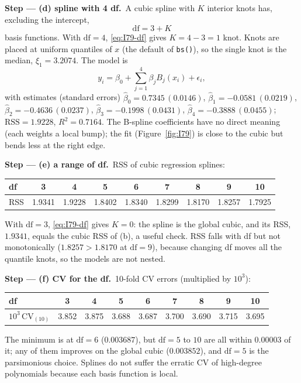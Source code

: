 \documentclass[11pt,a4paper]{article}
\numberwithin{equation}{questao}   %
\newcommand{\passo}[2]{\par\smallskip\noindent\textbf{Step --- #1.}~#2}
\begin{document}
\begin{sol}
\passo{(d) spline with 4 df}{A cubic spline with $K$ interior knots has, excluding the intercept,
\begin{equation}\label{eq:I79-df}
\mathrm{df}=3+K
\end{equation}
basis functions. With $\mathrm{df}=4$, \eqref{eq:I79-df} gives $K=4-3=1$ knot. Knots are placed
at uniform quantiles of $x$ (the default of \texttt{bs()}), so the single knot is the median,
$\xi_1=3.2074$. The model is
\begin{equation}\label{eq:I79-bs}
y_i=\beta_0+\sum_{j=1}^{4}\beta_jB_j(x_i)+\epsilon_i ,
\end{equation}
with estimates (standard errors) $\hat\beta_0=0.7345\,(0.0146)$, $\hat\beta_1=-0.0581\,(0.0219)$,
$\hat\beta_2=-0.4636\,(0.0237)$, $\hat\beta_3=-0.1998\,(0.0431)$, $\hat\beta_4=-0.3888\,(0.0455)$;
$\mathrm{RSS}=1.9228$, $R^2=0.7164$. The B-spline coefficients have no direct meaning (each
weights a local bump); the fit (Figure~\ref{fig:I79}) is close to the cubic but bends less at the
right edge.}

\passo{(e) a range of df}{RSS of cubic regression splines:
\begin{center}\begin{tabular}{lcccccccc}\toprule
df & 3 & 4 & 5 & 6 & 7 & 8 & 9 & 10\\\midrule
RSS & 1.9341 & 1.9228 & 1.8402 & 1.8340 & 1.8299 & 1.8170 & 1.8257 & 1.7925\\\bottomrule\end{tabular}\end{center}
With $\mathrm{df}=3$, \eqref{eq:I79-df} gives $K=0$: the spline is the global cubic, and its RSS,
$1.9341$, equals the cubic RSS of (b), a useful check. RSS falls with df but not monotonically
($1.8257>1.8170$ at $\mathrm{df}=9$), because changing df moves all the quantile knots, so the
models are not nested.}

\passo{(f) CV for the df}{10-fold CV errors (multiplied by $10^3$):
\begin{center}\small\begin{tabular}{lcccccccc}\toprule
df & 3 & 4 & 5 & 6 & 7 & 8 & 9 & 10\\\midrule
$10^3\,\mathrm{CV}_{(10)}$ & 3.852 & 3.875 & 3.688 & 3.687 & 3.700 & 3.690 & 3.715 & 3.695\\\bottomrule\end{tabular}\end{center}
The minimum is at $\mathrm{df}=6$ ($0.003687$), but $\mathrm{df}=5$ to $10$ are all within $0.00003$
of it; any of them improves on the global cubic ($0.003852$), and $\mathrm{df}=5$ is the
parsimonious choice. Splines do not suffer the erratic CV of high-degree polynomials because
each basis function is local.}


\end{sol}
\end{document}
